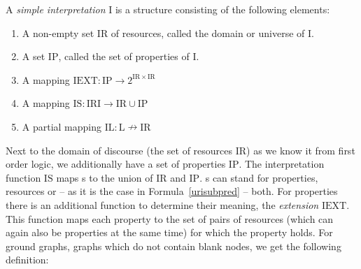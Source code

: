 \begin{definition}\label{si}
A \emph{simple interpretation} $\mathrm{I}$ is a structure consisting of the following elements:
\begin{enumerate}
 \item A non-empty set $\mathrm{IR}$ of resources, called the domain or universe of $\mathrm{I}$.
 \item A set $\mathrm{IP}$, called the set of properties of $\mathrm{I}$.
 \item A mapping $\mathrm{IEXT}: \mathrm{IP} \rightarrow 2^{\mathrm{IR}\times \mathrm{IR}}$
 \item A mapping $\mathrm{IS}:\mathrm{IRI}\rightarrow \mathrm{IR}\cup \mathrm{IP}$
 \item A partial mapping $\mathrm{IL}:\mathrm{L} \nrightarrow \mathrm{IR}$
\end{enumerate}
\end{definition}
Next to the domain of discourse (the set of resources $\mathrm{IR}$) as we know it from first order logic,  we additionally have 
a set of properties $\mathrm{IP}$.
The interpretation function $\mathrm{IS}$ maps \iri{}s to the union of $\mathrm{IR}$ and $\mathrm{IP}$. 
\iri{}s can stand for properties, resources or -- as it is the case in Formula~\ref{urisubpred} -- both. 
For properties there is an additional function to determine their meaning, the \emph{extension} $\mathrm{IEXT}$. 
This function  maps  each property to the set of pairs of resources (which can again also be properties at the same time) for which the property holds.
% 
% 
For ground graphs, \ie graphs which do not contain blank nodes, we get the following definition:
